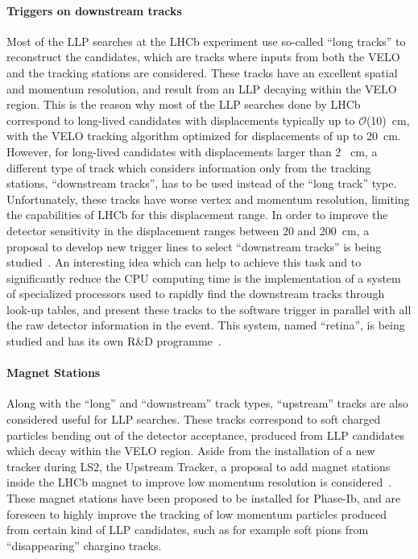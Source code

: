 \paragraph{Triggers on downstream tracks}

Most of the LLP searches at the LHCb experiment use so-called ``long tracks'' to reconstruct the candidates, which are tracks where inputs from both the VELO and the tracking stations are considered. These tracks have an excellent spatial and momentum resolution, and result from an LLP decaying within the VELO region. This is the reason why most of the LLP searches done by LHCb correspond to long-lived candidates with displacements typically up to $\mathcal{O}$(10)~cm, with the VELO tracking algorithm optimized for displacements of up to 20~cm. However, for long-lived candidates with displacements larger than 2~ cm, a different type of track which considers information only from the tracking stations, ``downstream tracks'', has to be used instead of the ``long track'' type. Unfortunately, these tracks have worse vertex and momentum resolution, limiting the capabilities of LHCb for this displacement range. In order to improve the detector sensitivity in the displacement ranges between 20 and 200~cm, a proposal to develop new trigger lines to select ``downstream tracks'' is being studied~\cite{Aaij:2244312}. An interesting idea which can help to achieve this task and to significantly reduce the CPU computing time is the implementation of a system of specialized processors used to rapidly find the downstream tracks through look-up tables, and present these tracks to the software trigger in parallel with all the raw detector information in the event. This system, named ``retina'', is being studied and has its own R\&D programme~\cite{Abba:2014iga}.

\paragraph{Magnet Stations}

Along with the ``long'' and ``downstream'' track types, ``upstream'' tracks are also considered useful for LLP searches. These tracks correspond to soft charged particles bending out of the detector acceptance, produced from LLP candidates which decay within the VELO region. Aside from the installation of a new tracker during LS2, the Upstream Tracker, a proposal to add magnet stations inside the LHCb magnet to improve low momentum resolution is considered~\cite{Aaij:2244311}. These magnet stations have been proposed to be installed for Phase-Ib, and are foreseen to highly improve the tracking of low momentum particles produced from certain kind of LLP candidates, such as for example soft pions from ``disappearing'' chargino tracks.

